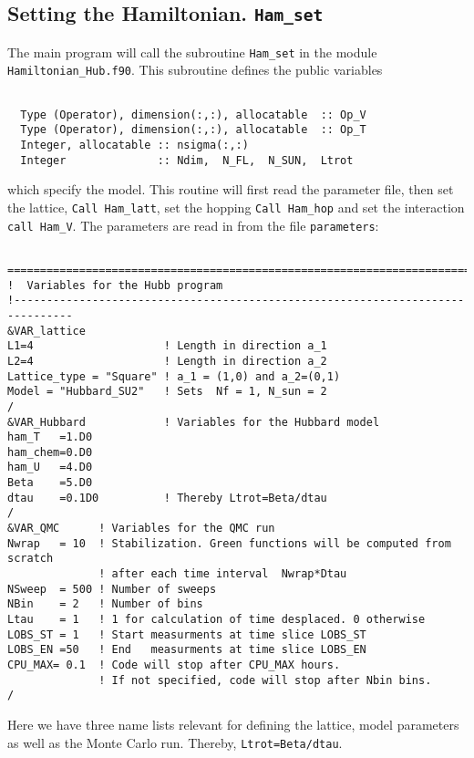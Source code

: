 \subsection{Setting the Hamiltonian.  \texttt{Ham\_set} }
The main program will call the subroutine   \texttt{Ham\_set} in the module \texttt{Hamiltonian\_Hub.f90}.
This  subroutine  defines the  public variables
\begin{lstlisting}

  Type (Operator), dimension(:,:), allocatable  :: Op_V
  Type (Operator), dimension(:,:), allocatable  :: Op_T
  Integer, allocatable :: nsigma(:,:)
  Integer              :: Ndim,  N_FL,  N_SUN,  Ltrot

\end{lstlisting}
which specify the model.  This  routine will first  read the parameter file,  then set the lattice, \texttt{Call Ham\_latt},  set the hopping \texttt{Call Ham\_hop}  and set the interaction
\texttt{call Ham\_V}.  
The parameters are read in from the file \texttt{parameters}: 
\begin{lstlisting}

===============================================================================
!  Variables for the Hubb program
!-------------------------------------------------------------------------------
&VAR_lattice
L1=4                    ! Length in direction a_1
L2=4                    ! Length in direction a_2
Lattice_type = "Square"	! a_1 = (1,0) and a_2=(0,1)
Model = "Hubbard_SU2"   ! Sets  Nf = 1, N_sun = 2
/
&VAR_Hubbard            ! Variables for the Hubbard model
ham_T   =1.D0
ham_chem=0.D0
ham_U   =4.D0
Beta    =5.D0
dtau    =0.1D0          ! Thereby Ltrot=Beta/dtau
/
&VAR_QMC      ! Variables for the QMC run
Nwrap   = 10  ! Stabilization. Green functions will be computed from scratch 
              ! after each time interval  Nwrap*Dtau
NSweep  = 500 ! Number of sweeps
NBin    = 2   ! Number of bins
Ltau    = 1   ! 1 for calculation of time desplaced. 0 otherwise
LOBS_ST = 1   ! Start measurments at time slice LOBS_ST
LOBS_EN =50   ! End   measurments at time slice LOBS_EN
CPU_MAX= 0.1  ! Code will stop after CPU_MAX hours. 
              ! If not specified, code will stop after Nbin bins.
/

\end{lstlisting}
Here we have three name lists relevant for  defining the lattice, model parameters as well  as the Monte Carlo run.   Thereby, \texttt{Ltrot=Beta/dtau}. 

